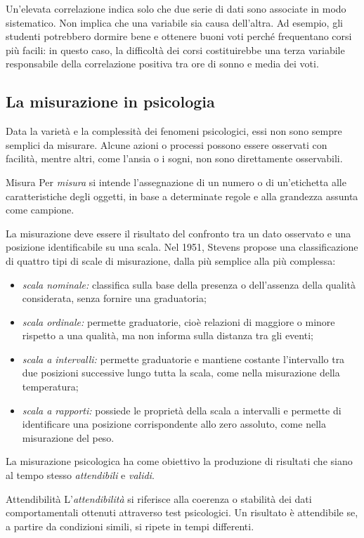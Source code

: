 \documentclass[a4paper]{article}
\begin{document}
Un'elevata correlazione indica solo che due serie di dati sono associate in modo sistematico. Non implica che una variabile sia causa dell'altra. Ad esempio, gli studenti potrebbero dormire bene e ottenere buoni voti perché frequentano corsi più facili: in questo caso, la difficoltà dei corsi costituirebbe una terza variabile responsabile della correlazione positiva tra ore di sonno e media dei voti.
\subsection{La misurazione in psicologia}
Data la varietà e la complessità dei fenomeni psicologici, essi non sono sempre semplici da misurare. Alcune azioni o processi possono essere osservati con facilità, mentre altri, come l'ansia o i sogni, non sono direttamente osservabili.
\begin{snippetdefinition}{Misura}
    Per \emph{misura} si intende l'assegnazione di un numero o di un'etichetta alle caratteristiche degli oggetti, in base a determinate regole e alla grandezza assunta come campione.
\end{snippetdefinition}
La misurazione deve essere il risultato del confronto tra un dato osservato e una posizione identificabile su una scala.
Nel 1951, Stevens propose una classificazione di quattro tipi di scale di misurazione, dalla più semplice alla più complessa:
\begin{itemize}
    \item \emph{scala nominale:} classifica sulla base della presenza o dell'assenza della qualità considerata, senza fornire una graduatoria;
    \item \emph{scala ordinale:} permette graduatorie, cioè relazioni di maggiore o minore rispetto a una qualità, ma non informa sulla distanza tra gli eventi;
    \item \emph{scala a intervalli:} permette graduatorie e mantiene costante l'intervallo tra due posizioni successive lungo tutta la scala, come nella misurazione della temperatura;
    \item \emph{scala a rapporti:} possiede le proprietà della scala a intervalli e permette di identificare una posizione corrispondente allo zero assoluto, come nella misurazione del peso.
\end{itemize}
La misurazione psicologica ha come obiettivo la produzione di risultati che siano al tempo stesso \emph{attendibili} e \emph{validi}.
\begin{snippetdefinition}{Attendibilità}
    L'\emph{attendibilità} si riferisce alla coerenza o stabilità dei dati comportamentali ottenuti attraverso test psicologici. Un risultato è attendibile se, a partire da condizioni simili, si ripete in tempi differenti.
\end{snippetdefinition}
\end{document}
